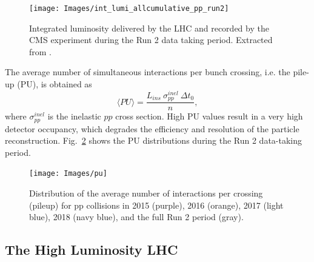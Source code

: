 \documentclass[../main.tex]{subfiles}
\begin{document}
\begin{figure}[h!]
\begin{center}
\texttt{[image: Images/int\_lumi\_allcumulative\_pp\_run2]}
\end{center}
\caption{Integrated luminosity delivered by the LHC and recorded by the CMS experiment during the Run 2 data taking period. Extracted from \cite{intro:exp:cms_lumi}.}
\label{intro:fig:lumi_int}
\end{figure}



The average number of simultaneous interactions per bunch crossing, i.e. the pile-up (PU), is obtained as
\begin{equation}
\langle PU \rangle = \frac{L_{ins}~\sigma_{pp}^{inel}~\Delta t_0}{n},
\end{equation}
where $\sigma_{pp}^{inel}$ is the inelastic $pp$ cross section. High PU values result in a very high detector occupancy, which degrades the efficiency and resolution of the particle reconstruction. Fig.~\ref{intro:fig:pu} shows the PU distributions during the Run 2 data-taking period. 

\begin{figure}[h!]
\begin{center}
\texttt{[image: Images/pu]}
\end{center}
\caption{Distribution of the average number of interactions per crossing (pileup) for pp collisions in 2015 (purple), 2016 (orange), 2017 (light blue), 2018 (navy blue), and the full Run 2 period (gray).}
\label{intro:fig:pu}
\end{figure}



\subsection{The High Luminosity LHC}
\label{intro:sec:hllhc}
\end{document}
